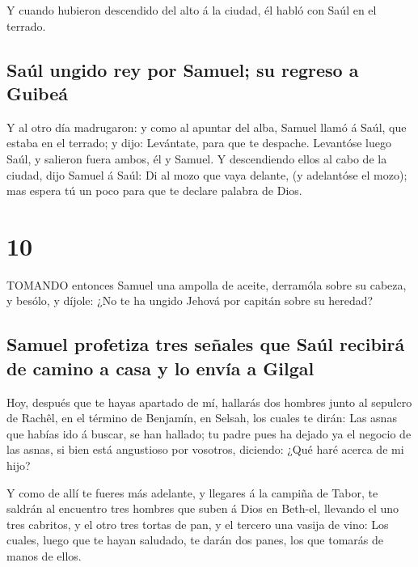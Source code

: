  Y cuando hubieron descendido del alto á la ciudad, él
habló con Saúl en el terrado.

\hypertarget{sauxfal-ungido-rey-por-samuel-su-regreso-a-guibeuxe1}{%
\subsection{Saúl ungido rey por Samuel; su regreso a
Guibeá}\label{sauxfal-ungido-rey-por-samuel-su-regreso-a-guibeuxe1}}

 Y al otro día madrugaron: y como al apuntar del alba,
Samuel llamó á Saúl, que estaba en el terrado; y dijo: Levántate, para
que te despache. Levantóse luego Saúl, y salieron fuera ambos, él y
Samuel.  Y descendiendo ellos al cabo de la ciudad, dijo
Samuel á Saúl: Di al mozo que vaya delante, (y adelantóse el mozo); mas
espera tú un poco para que te declare palabra de Dios.

\hypertarget{section-9}{%
\section{10}\label{section-9}}

 TOMANDO entonces Samuel una ampolla de aceite, derramóla
sobre su cabeza, y besólo, y díjole: ¿No te ha ungido Jehová por capitán
sobre su heredad?

\hypertarget{samuel-profetiza-tres-seuxf1ales-que-sauxfal-recibiruxe1-de-camino-a-casa-y-lo-envuxeda-a-gilgal}{%
\subsection{Samuel profetiza tres señales que Saúl recibirá de camino a
casa y lo envía a
Gilgal}\label{samuel-profetiza-tres-seuxf1ales-que-sauxfal-recibiruxe1-de-camino-a-casa-y-lo-envuxeda-a-gilgal}}

 Hoy, después que te hayas apartado de mí, hallarás dos
hombres junto al sepulcro de Rachêl, en el término de Benjamín, en
Selsah, los cuales te dirán: Las asnas que habías ido á buscar, se han
hallado; tu padre pues ha dejado ya el negocio de las asnas, si bien
está angustioso por vosotros, diciendo: ¿Qué haré acerca de mi hijo?

 Y como de allí te fueres más adelante, y llegares á la
campiña de Tabor, te saldrán al encuentro tres hombres que suben á Dios
en Beth-el, llevando el uno tres cabritos, y el otro tres tortas de pan,
y el tercero una vasija de vino:  Los cuales, luego que te
hayan saludado, te darán dos panes, los que tomarás de manos de ellos.

